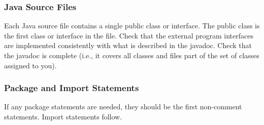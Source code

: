 \subsubsection{Java Source Files}
\begin{itemize}
		Each Java source file contains a single public class or interface.
		The public class is the first class or interface in the file.
		Check that the external program interfaces are implemented consistently with what is described in the javadoc.
		Check that the javadoc is complete (i.e., it covers all classes and files part of the set of classes assigned to you).
\end{itemize}

\subsubsection{Package and Import Statements}
\begin{itemize}
		If any package statements are needed, they should be the first non-comment statements. Import statements follow.
\end{itemize}


